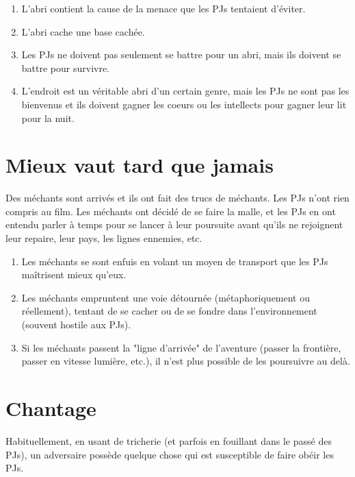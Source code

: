 \begin{multicols}{2}
\themes
\begin{enumerate}
\item L'abri contient la cause de la menace que les PJs tentaient d'éviter.
\item L'abri cache une base cachée.
\item Les PJs ne doivent pas seulement se battre pour un abri, mais ils doivent se battre pour survivre.
\item L'endroit est un véritable abri d'un certain genre, mais les PJs ne sont pas les bienvenus et ils doivent gagner les coeurs ou les intellects pour gagner leur lit pour la nuit.
\end{enumerate}

\section{Mieux vaut tard que jamais}
\label{mieuxvaut}


Des méchants sont arrivés et ils ont fait des trucs de méchants. Les PJs n'ont rien compris au film. Les méchants ont décidé de se faire la malle, et les PJs en ont entendu parler à temps pour se lancer à leur poursuite avant qu'ils ne rejoignent leur repaire, leur pays, les lignes ennemies, etc.

\themes
\begin{enumerate}
\item Les méchants se sont enfuis en volant un moyen de transport que les PJs maîtrisent mieux qu’eux.
\item Les méchants empruntent une voie détournée (métaphoriquement ou réellement), tentant de se cacher ou de se fondre dans l’environnement (souvent hostile aux PJs).
\item Si les méchants passent la "ligne d’arrivée" de l’aventure (passer la frontière, passer en vitesse lumière, etc.), il n’est plus possible de les poursuivre au delà.
\end{enumerate}


\section{Chantage}
\label{chantage}


Habituellement, en usant de tricherie (et parfois en fouillant dans le passé des PJs), un adversaire possède quelque chose qui est susceptible de faire obéir les PJs.


\end{multicols}
